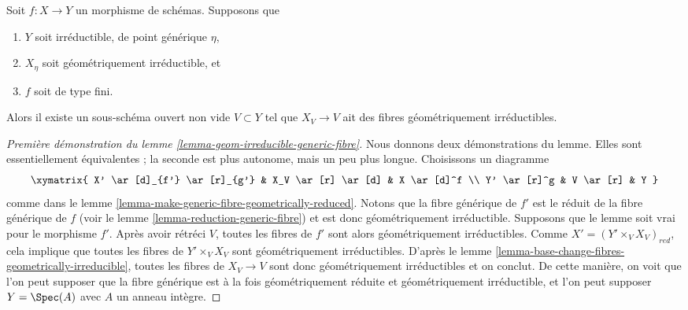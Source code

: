\begin{lemma}
\label{lemma-geom-irreducible-generic-fibre}
Soit $f : X \to Y$ un morphisme de schémas.
Supposons que
\begin{enumerate}
\item $Y$ soit irréductible, de point générique $\eta$,
\item $X_\eta$ soit géométriquement irréductible, et
\item $f$ soit de type fini.
\end{enumerate}
Alors il existe un sous-schéma ouvert non vide $V \subset Y$
tel que $X_V \to V$ ait des fibres géométriquement irréductibles.
\end{lemma}

\begin{proof}[Première démonstration du lemme \ref{lemma-geom-irreducible-generic-fibre}]
Nous donnons deux démonstrations du lemme. Elles sont essentiellement équivalentes ;
la seconde est plus autonome, mais un peu plus longue.
Choisissons un diagramme
$$
\xymatrix{
X' \ar[d]_{f'} \ar[r]_{g'} & X_V \ar[r] \ar[d] & X \ar[d]^f \\
Y' \ar[r]^g & V \ar[r] & Y
}
$$
comme dans le
lemme \ref{lemma-make-generic-fibre-geometrically-reduced}.
Notons que la fibre générique de $f'$ est le réduit de la
fibre générique de $f$ (voir le
lemme \ref{lemma-reduction-generic-fibre})
et est donc géométriquement irréductible.
Supposons que le lemme soit vrai pour le morphisme $f'$. Après avoir rétréci
$V$, toutes les fibres de $f'$ sont alors géométriquement irréductibles.
Comme $X' = (Y' \times_V X_V)_{red}$, cela implique que toutes les fibres
de $Y' \times_V X_V$ sont géométriquement irréductibles. D'après le
lemme \ref{lemma-base-change-fibres-geometrically-irreducible},
toutes les fibres de $X_V \to V$ sont donc géométriquement irréductibles et
on conclut. De cette manière, on voit que l'on peut supposer que la fibre générique
est à la fois géométriquement réduite et géométriquement irréductible,
et l'on peut supposer $Y = \Spec(A)$ avec $A$ un anneau intègre.


\end{proof}

